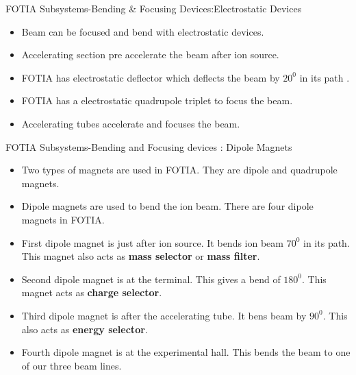 \documentclass[11pt]{beamer}
\begin{document}
\begin{frame}{FOTIA Subsystems-Bending \& Focusing Devices:Electrostatic Devices}

  \begin{itemize}
   
   
    \item Beam can be focused and bend with electrostatic devices.
    \item Accelerating section pre accelerate the beam after ion source.%
    \item FOTIA has electrostatic deflector which deflects the beam by $20^0$ in its path .
    \item FOTIA has a electrostatic quadrupole triplet to focus the beam.
    \item Accelerating tubes accelerate and focuses the beam.
    
   \end{itemize}

\end{frame}


\begin{frame}{FOTIA Subsystems-Bending and Focusing devices : Dipole Magnets}

  \begin{itemize}
   
    \item Two types of magnets are used in FOTIA. They are dipole and quadrupole magnets.
    \item Dipole magnets are used to bend the ion beam. There are four dipole magnets in FOTIA.
    \item First dipole magnet is just after ion source. It bends ion beam $70^0$ in its path. This magnet also acts as \textbf{mass selector} or \textbf{mass filter}.
    \item Second dipole magnet is at the terminal. This gives a bend of $180^0$. This magnet acts as \textbf{charge selector}.
    \item Third dipole magnet is after the accelerating tube. It bens beam by $90^0$. This also acts as \textbf{energy selector}.
    \item Fourth dipole magnet is at the experimental hall. This bends the beam to one of our three beam lines.
   
   \end{itemize}

\end{frame}
\end{document}
